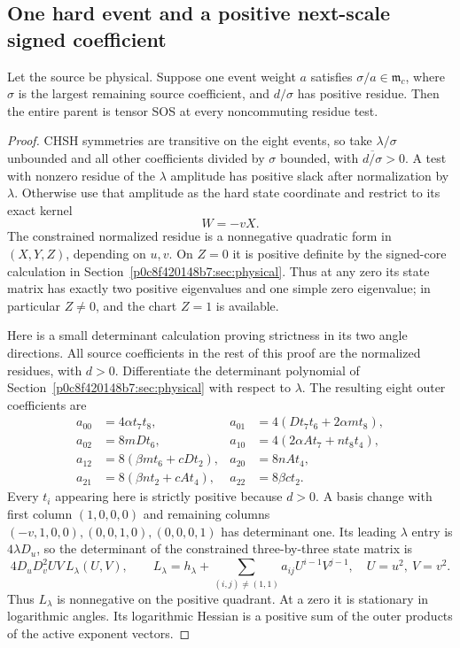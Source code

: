 \subsection{One hard event and a positive next-scale signed coefficient}
\begin{proposition}\label{pb16e5066334b:prop:one-hard-event}
Let the source be physical. Suppose one event weight $a$ satisfies $\sigma/a\in\mathfrak m_c$, where $\sigma$ is the largest remaining source coefficient, and $d/\sigma$ has positive residue. Then the entire parent is tensor SOS at every noncommuting residue test.
\end{proposition}
\begin{proof}
CHSH symmetries are transitive on the eight events, so take $\lambda/\sigma$ unbounded and all other coefficients divided by $\sigma$ bounded, with $\overline{d/\sigma}>0$. A test with nonzero residue of the $\lambda$ amplitude has positive slack after normalization by $\lambda$. Otherwise use that amplitude as the hard state coordinate and restrict to its exact kernel
\[
W=-vX.
\]
The constrained normalized residue is a nonnegative quadratic form in $(X,Y,Z)$, depending on $u,v$. On $Z=0$ it is positive definite by the signed-core calculation in Section~\ref{p0c8f420148b7:sec:physical}. Thus at any zero its state matrix has exactly two positive eigenvalues and one simple zero eigenvalue; in particular $Z\ne0$, and the chart $Z=1$ is available.

Here is a small determinant calculation proving strictness in its two angle directions. All source coefficients in the rest of this proof are the normalized residues, with $d>0$. Differentiate the determinant polynomial of Section~\ref{p0c8f420148b7:sec:physical} with respect to $\lambda$. The resulting eight outer coefficients are
\begin{align*}
a_{00}&=4\alpha t_7t_8,&
a_{01}&=4(Dt_7t_6+2\alpha m t_8),\\
a_{02}&=8mDt_6,&
a_{10}&=4(2\alpha A t_7+nt_8t_4),\\
a_{12}&=8(\beta m t_6+cDt_2),&
a_{20}&=8nAt_4,\\
a_{21}&=8(\beta n t_2+cAt_4),&
a_{22}&=8\beta ct_2.
\end{align*}
Every $t_i$ appearing here is strictly positive because $d>0$. A basis change with first column $(1,0,0,0)$ and remaining columns $(-v,1,0,0),(0,0,1,0),(0,0,0,1)$ has determinant one. Its leading $\lambda$ entry is $4\lambda D_u$, so the determinant of the constrained three-by-three state matrix is
\[
4D_uD_v^2UV\,L_\lambda(U,V),\qquad
L_\lambda=h_\lambda+\sum_{(i,j)\ne(1,1)}a_{ij}U^{i-1}V^{j-1},
\quad U=u^2,\ V=v^2.
\]
Thus $L_\lambda$ is nonnegative on the positive quadrant. At a zero it is stationary in logarithmic angles. Its logarithmic Hessian is a positive sum of the outer products of the active exponent vectors.


\end{proof}
